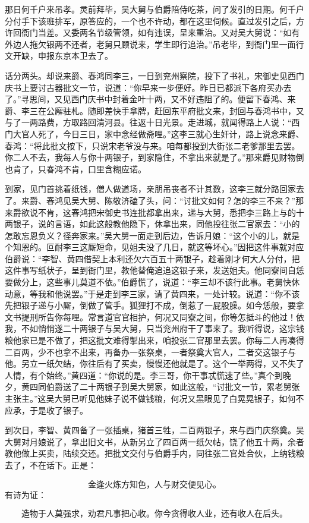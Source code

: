 那日何千户来吊孝。灵前拜毕，吴大舅与伯爵陪侍吃茶，问了发引的日期。何千户分付手下该班排军，原答应的，一个也不许动，都在这里伺候。直过发引之后，方许回衙门当差。又委两名节级管领，如有违误，呈来重治。又对吴大舅说：“如有外边人拖欠银两不还者，老舅只顾说来，学生即行追治。”吊老毕，到衙门里一面行文开缺，申报东京本卫去了。

话分两头。却说来爵、春鸿同李三，一日到兖州察院，投下了书礼，宋御史见西门庆书上要讨古器批文一节，说道：“你早来一步便好。昨日已都派下各府买办去了。”寻思间，又见西门庆书中封着金叶十两，又不好违阻了的。便留下春鸿、来爵、李三在公廨驻札。随即差快手拿牌，赶回东平府批文来，封回与春鸿书中，又与了一两路费，方取路回清河县。往返十日光景。走进城，就闻得路上人说：“西门大官人死了，今日三日，家中念经做斋哩。”这李三就心生奸计，路上说念来爵、春鸿：“将此批文按下，只说宋老爷没与来。咱每都投到大街张二老爹那里去罢。你二人不去，我每人与你十两银子，到家隐住，不拿出来就是了。”那来爵见财物倒也肯了，只春鸿不肯，口里含糊应诺。

到家，见门首挑着纸钱，僧人做道场，亲朋吊丧者不计其数，这李三就分路回家去了。来爵、春鸿见吴大舅、陈敬济磕了头，问：“讨批文如何？怎的李三不来？”那来爵欲说不肯，这春鸿把宋御史书连批都拿出来，递与大舅，悉把李三路上与的十两银子，说的言语，如此这般教他隐下，休拿出来，同他投往张二官家去：“小的怎敢忘恩负义？径奔家来。”吴大舅一面走到后边，告诉月娘：“这个小的儿，就是个知恩的。叵耐李三这厮短命，见姐夫没了几日，就这等坏心。”因把这件事就对应伯爵说：“李智、黄四借契上本利还欠六百五十两银子，趁着刚才何大人分付，把这件事写纸状子，呈到衙门里，教他替俺追追这银子来，发送姐夫。他同寮间自恁要做分上，这些事儿莫道不依。”伯爵慌了，说道：“李三却不该行此事。老舅快休动意，等我和他说罢。”于是走到李三家，请了黄四来，一处计较。说道：“你不该先把银子递与小厮，倒做了管手。狐狸打不成，倒惹了一屁股臊。如今恁般，要拿文书提刑所告你每哩。常言道官官相护，何况又同寮之间，你等怎抵斗的他过！依我，不如悄悄遂二十两银子与吴大舅，只当兖州府干了事来了。我听得说，这宗钱粮他家已是不做了，把这批文难得掣出来，咱投张二官那里去罢。你每二人再凑得二百两，少不也拿不出来，再备办一张祭桌，一者祭奠大官人，二者交这银子与他。另立一纸欠结，你往后有了买卖，慢慢还他就是了。这个一举两得，又不失了人情，有个始终。”黄四道：“你说的是。李三哥，你干事忒慌速了些。”真个到晚夕，黄四同伯爵送了二十两银子到吴大舅家，如此这般，“讨批文一节，累老舅张主张主。”这吴大舅已听见他妹子说不做钱粮，何况又黑眼见了白晃晃银子，如何不应承，于是收了银子。

到次日，李智、黄四备了一张插桌，猪首三牲，二百两银子，来与西门庆祭奠。吴大舅对月娘说了，拿出旧文书，从新另立了四百两一纸欠帖，饶了他五十两，余者教他做上买卖，陆续交还。把批文交付与伯爵手内，同往张二官处合伙，上纳钱粮去了，不在话下。正是：

\[
金逢火炼方知色，人与财交便见心。
\]
有诗为证：

\[
造物于人莫强求，劝君凡事把心收。
你今贪得收人业，还有收人在后头。
\]
